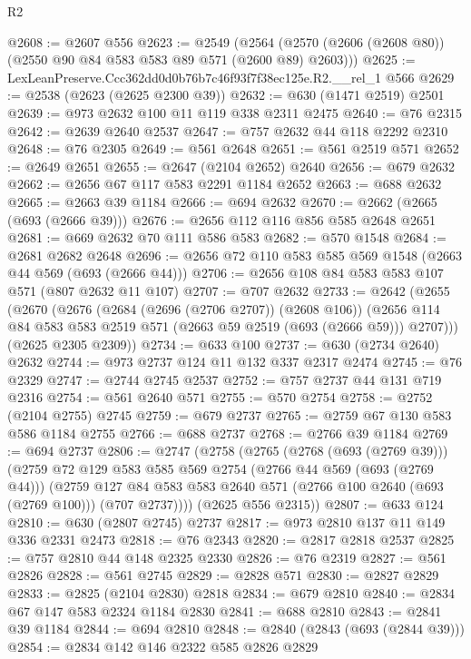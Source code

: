 \begin{lexlean}{R2}
\begin{coremodule}
@2608 := @2607 @556
@2623 := @2549
    (@2564 (@2570 (@2606 (@2608 @80)) (@2550 @90 @84 @583 @583 @89 @571 (@2600 @89) @2603)))
@2625 := LexLeanPreserve.Ccc362dd0d0b76b7c46f93f7f38ec125e.R2.__rel_1 @566
@2629 := @2538 (@2623 (@2625 @2300 @39))
@2632 := @630 (@1471 @2519) @2501
@2639 := @973 @2632 @100 @11 @119 @338 @2311 @2475
@2640 := @76 @2315
@2642 := @2639 @2640 @2537
@2647 := @757 @2632 @44 @118 @2292 @2310
@2648 := @76 @2305
@2649 := @561 @2648
@2651 := @561 @2519 @571
@2652 := @2649 @2651
@2655 := @2647 (@2104 @2652) @2640
@2656 := @679 @2632
@2662 := @2656 @67 @117 @583 @2291 @1184 @2652
@2663 := @688 @2632
@2665 := @2663 @39 @1184
@2666 := @694 @2632
@2670 := @2662 (@2665 (@693 (@2666 @39)))
@2676 := @2656 @112 @116 @856 @585 @2648 @2651
@2681 := @669 @2632 @70 @111 @586 @583
@2682 := @570 @1548
@2684 := @2681 @2682 @2648
@2696 := @2656 @72 @110 @583 @585 @569 @1548 (@2663 @44 @569 (@693 (@2666 @44)))
@2706 := @2656 @108 @84 @583 @583 @107 @571 (@807 @2632 @11 @107)
@2707 := @707 @2632
@2733 := @2642
    (@2655
      (@2670
        (@2676
          (@2684 (@2696 (@2706 @2707)) (@2608 @106))
          (@2656 @114 @84 @583 @583 @2519 @571 (@2663 @59 @2519 (@693 (@2666 @59))) @2707)))
      (@2625 @2305 @2309))
@2734 := @633 @100
@2737 := @630 (@2734 @2640) @2632
@2744 := @973 @2737 @124 @11 @132 @337 @2317 @2474
@2745 := @76 @2329
@2747 := @2744 @2745 @2537
@2752 := @757 @2737 @44 @131 @719 @2316
@2754 := @561 @2640 @571
@2755 := @570 @2754
@2758 := @2752 (@2104 @2755) @2745
@2759 := @679 @2737
@2765 := @2759 @67 @130 @583 @586 @1184 @2755
@2766 := @688 @2737
@2768 := @2766 @39 @1184
@2769 := @694 @2737
@2806 := @2747
    (@2758
      (@2765
        (@2768 (@693 (@2769 @39)))
        (@2759
          @72
          @129
          @583
          @585
          @569
          @2754
          (@2766 @44 @569 (@693 (@2769 @44)))
          (@2759
            @127
            @84
            @583
            @583
            @2640
            @571
            (@2766 @100 @2640 (@693 (@2769 @100)))
            (@707 @2737))))
      (@2625 @556 @2315))
@2807 := @633 @124
@2810 := @630 (@2807 @2745) @2737
@2817 := @973 @2810 @137 @11 @149 @336 @2331 @2473
@2818 := @76 @2343
@2820 := @2817 @2818 @2537
@2825 := @757 @2810 @44 @148 @2325 @2330
@2826 := @76 @2319
@2827 := @561 @2826
@2828 := @561 @2745
@2829 := @2828 @571
@2830 := @2827 @2829
@2833 := @2825 (@2104 @2830) @2818
@2834 := @679 @2810
@2840 := @2834 @67 @147 @583 @2324 @1184 @2830
@2841 := @688 @2810
@2843 := @2841 @39 @1184
@2844 := @694 @2810
@2848 := @2840 (@2843 (@693 (@2844 @39)))
@2854 := @2834 @142 @146 @2322 @585 @2826 @2829

\end{coremodule}
\end{lexlean}
